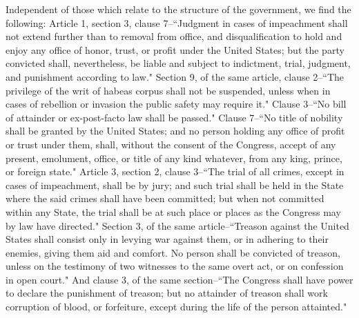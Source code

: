 Independent of those which relate to the structure of the government, we find the following: Article 1, section 3, clause 7--``Judgment in cases of impeachment shall not extend further than to removal from office, and disqualification to hold and enjoy any office of honor, trust, or profit under the United States; but the party convicted shall, nevertheless, be liable and subject to indictment, trial, judgment, and punishment according to law." Section 9, of the same article, clause 2--``The privilege of the writ of habeas corpus shall not be suspended, unless when in cases of rebellion or invasion the public safety may require it." Clause 3--``No bill of attainder or ex-post-facto law shall be passed." Clause 7--``No title of nobility shall be granted by the United States; and no person holding any office of profit or trust under them, shall, without the consent of the Congress, accept of any present, emolument, office, or title of any kind whatever, from any king, prince, or foreign state." Article 3, section 2, clause 3--``The trial of all crimes, except in cases of impeachment, shall be by jury; and such trial shall be held in the State where the said crimes shall have been committed; but when not committed within any State, the trial shall be at such place or places as the Congress may by law have directed." Section 3, of the same article--``Treason against the United States shall consist only in levying war against them, or in adhering to their enemies, giving them aid and comfort. No person shall be convicted of treason, unless on the testimony of two witnesses to the same overt act, or on confession in open court." And clause 3, of the same section--``The Congress shall have power to declare the punishment of treason; but no attainder of treason shall work corruption of blood, or forfeiture, except during the life of the person attainted."


